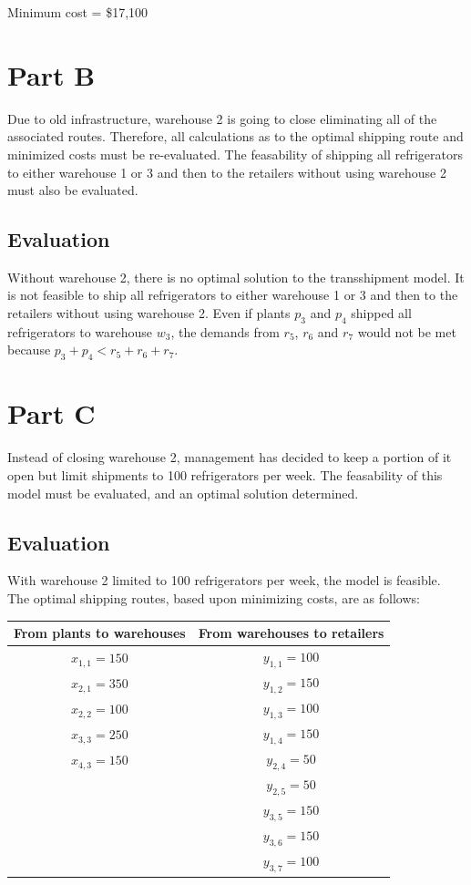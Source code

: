 \documentclass[11pt]{scrreprt}
\begin{document}
Minimum cost = \$17,100

\section{Part B}
Due to old infrastructure, warehouse 2 is going to close eliminating 
all of the associated routes. Therefore, all calculations as to the
optimal shipping route and minimized costs must be re-evaluated. The 
feasability of shipping all refrigerators to either warehouse 1 or 3
and then to the retailers without using warehouse 2 must also be
evaluated.

\subsection{Evaluation}
Without warehouse 2, there is no optimal solution to the transshipment 
model. It is not feasible to ship all refrigerators to either warehouse
1 or 3 and then to the retailers without using warehouse 2. Even if 
plants $p_3$ and $p_4$ shipped all refrigerators to warehouse $w_3$, 
the demands from $r_5$, $r_6$ and $r_7$ would not be met because
$p_3 + p_4 < r_5 + r_6 + r_7$.

\section{Part C}
Instead of closing warehouse 2, management has decided to keep a 
portion of it open but limit shipments to 100 refrigerators per week. 
The feasability of this model must be evaluated, and an optimal 
solution determined.

\subsection{Evaluation}
With warehouse 2 limited to 100 refrigerators per week, the model is
feasible. The optimal shipping routes, based upon minimizing costs, 
are as follows: \\

\begin{tabular}{|c|c|}
	\hline From plants to warehouses & From warehouses to retailers \\
	\hline $x_{1,1} = 150$ & $y_{1,1} = 100$ \\
	\hline $x_{2,1} = 350$ & $y_{1,2} = 150$ \\
	\hline $x_{2,2} = 100$ & $y_{1,3} = 100$  \\
	\hline $x_{3,3} = 250$ & $y_{1,4} = 150$  \\
	\hline $x_{4,3} = 150$ & $y_{2,4} = 50$  \\
	\hline 				  & $y_{2,5} = 50$ \\
	\hline 				  & $y_{3,5} = 150$ \\
	\hline 				  & $y_{3,6} = 150$ \\
	\hline 				  & $y_{3,7} = 100$ \\
	\hline
\end{tabular} \\
\end{document}
